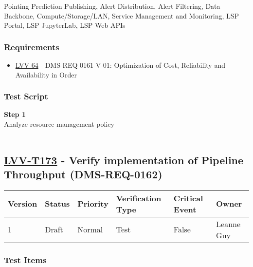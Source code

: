 Pointing Prediction Publishing, Alert Distribution, Alert Filtering,
Data Backbone, Compute/Storage/LAN, Service Management and Monitoring,
LSP Portal, LSP JupyterLab, LSP Web APIs

\hypertarget{requirements-149}{%
\subsubsection{Requirements}\label{requirements-149}}

\begin{itemize}
\tightlist
\item
  \href{https://jira.lsstcorp.org/browse/LVV-64}{LVV-64} -
  DMS-REQ-0161-V-01: Optimization of Cost, Reliability and Availability
  in Order
\end{itemize}

\hypertarget{test-script-149}{%
\subsubsection{Test Script}\label{test-script-149}}

\textbf{Step 1}\\
Analyze resource management policy\\
~\\

\hypertarget{lvv-t173---verify-implementation-of-pipeline-throughput-dms-req-0162}{%
\subsection{\texorpdfstring{\href{https://jira.lsstcorp.org/secure/Tests.jspa\#/testCase/LVV-T173}{LVV-T173}
- Verify implementation of Pipeline Throughput
(DMS-REQ-0162)}{LVV-T173 - Verify implementation of Pipeline Throughput (DMS-REQ-0162)}}\label{lvv-t173---verify-implementation-of-pipeline-throughput-dms-req-0162}}

\begin{longtable}[]{@{}llllll@{}}
\toprule
Version & Status & Priority & Verification Type & Critical Event &
Owner\tabularnewline
\midrule
\endhead
1 & Draft & Normal & Test & False & Leanne Guy\tabularnewline
\bottomrule
\end{longtable}

\hypertarget{test-items-149}{%
\subsubsection{Test Items}\label{test-items-149}}

